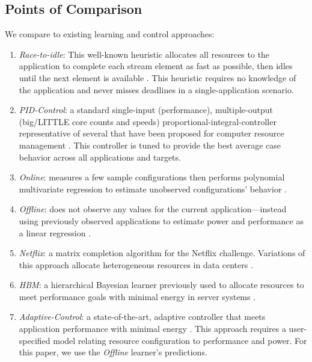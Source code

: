\subsection{Points of Comparison}
We compare to existing learning and control approaches:
\begin{enumerate}[leftmargin=1em]
\item \textit{Race-to-idle}: This well-known heuristic allocates all
  resources to the application to complete each stream element as fast
  as possible, then idles until the next element is available
  \cite{kim-cpsna,powerslope,LeSueur11}.  This heuristic requires no
  knowledge of the application and never misses deadlines in a
  single-application scenario.
\item \textit{PID-Control}: a standard single-input (performance),
  multiple-output (big/LITTLE core counts and speeds)
  prop\-ortional-integral-controller representative of several that
  have been proposed for computer resource management
  \cite{Hellerstein2004a,METE}.  This controller is tuned to provide
  the best average case behavior across all applications and targets.
\item \textit{Online}: measures a few sample configurations then
  performs polynomial multivariate regression to estimate unobserved
  configurations' behavior \cite{LEO,Li2006,Ponamarev}.
\item \textit{Offline}: does not observe any values for the current
  application---instead using previously observed applications to
  estimate power and performance as a linear regression
  \cite{PUPiL,LeeBrooks2006,CPR}.
\item \textit{Netflix}: a matrix completion algorithm for the
  Netflix challenge. Variations of this approach allocate
  heterogeneous resources in data centers \cite{Paragon,quasar}.
\item \textit{HBM}: a hierarchical Bayesian learner previously used
  to allocate resources to meet performance goals with minimal energy
  in server systems \cite{LEO}. 
\item \textit{Adaptive-Control}: a state-of-the-art, adaptive
  controller that meets application performance with minimal energy
  \cite{POET}.  This approach requires a user-specified model relating
  resource configuration to performance and power.  For this paper, we
  use the \emph{Offline} learner's predictions.  
\end{enumerate}


